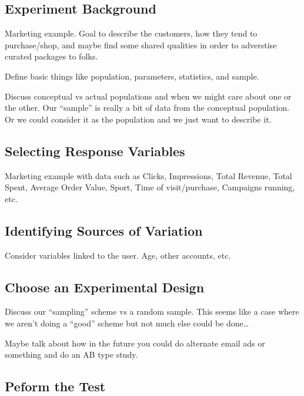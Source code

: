 \documentclass[]{book}
\begin{document}
\subsection{Experiment Background}\label{experiment-background}

Marketing example. Goal to describe the customers, how they tend to
purchase/shop, and maybe find some shared qualities in order to
adverstise curated packages to folks.

Define basic things like population, parameters, statistics, and sample.

Discuss conceptual vs actual populations and when we might care about
one or the other. Our ``sample'' is really a bit of data from the
conceptual population. Or we could consider it as the population and we
just want to describe it.

\subsection{Selecting Response
Variables}\label{selecting-response-variables}

Marketing example with data such as Clicks, Impressions, Total Revenue,
Total Spent, Average Order Value, Sport, Time of visit/purchase,
Campaigns running, etc.

\subsection{Identifying Sources of
Variation}\label{identifying-sources-of-variation}

Consider variables linked to the user. Age, other accounts, etc.

\subsection{Choose an Experimental Design
}\label{choose-an-experimental-design}

Discuss our ``sampling'' scheme vs a random sample. This seems like a
case where we aren't doing a ``good'' scheme but not much else could be
done\ldots{}

Maybe talk about how in the future you could do alternate email ads or
something and do an AB type study.

\subsection{Peform the Test }\label{peform-the-test}
\end{document}

